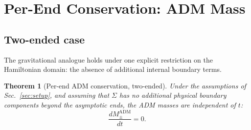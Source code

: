 \documentclass[aps,prd,onecolumn,nofootinbib,superscriptaddress]{revtex4-2}
\newtheorem{theorem}{Theorem}
\begin{document}
\section{Per-End Conservation: ADM Mass}
\label{sec:adm}

\subsection{Two-ended case}

The gravitational analogue holds under one explicit restriction on the
Hamiltonian domain: the absence of additional internal boundary terms.

\begin{theorem}[Per-end ADM conservation, two-ended]
\label{thm:M-conservation}
Under the assumptions of Sec.~\ref{sec:setup}, and assuming that $\Sigma$ has
no additional physical boundary components beyond the asymptotic ends, the ADM
masses are independent of $t$:
\begin{equation}
  \frac{dM_\pm^{\mathrm{ADM}}}{dt} = 0.
\end{equation}
\end{theorem}
\end{document}
